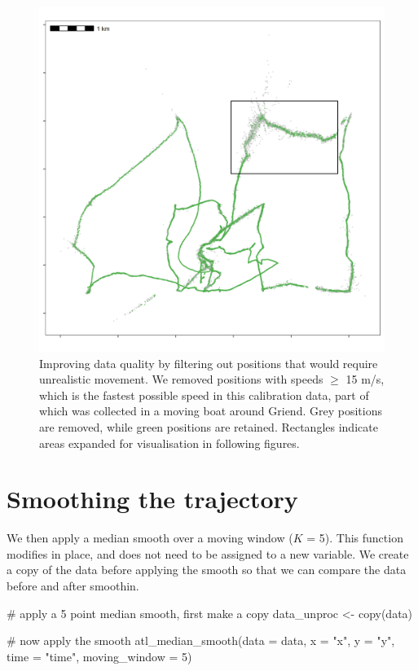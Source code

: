 \documentclass[]{scrreprt}
\newenvironment{Shaded}{}{}
\newcommand{\CommentTok}[1]{\textcolor[rgb]{0.00,0.50,0.00}{#1}}
\newcommand{\DataTypeTok}[1]{#1}
\newcommand{\DecValTok}[1]{#1}
\newcommand{\KeywordTok}[1]{\textcolor[rgb]{0.00,0.00,1.00}{#1}}
\newcommand{\NormalTok}[1]{#1}
\newcommand{\StringTok}[1]{\textcolor[rgb]{0.00,0.50,0.50}{#1}}
\begin{document}
\begin{figure}
\centering
\includegraphics{figures/fig_speed_outlier.png}
\caption{Improving data quality by filtering out positions that would require unrealistic movement. We removed positions with speeds \(\geq\) 15 m/s, which is the fastest possible speed in this calibration data, part of which was collected in a moving boat around Griend. Grey positions are removed, while green positions are retained. Rectangles indicate areas expanded for visualisation in following figures.}
\end{figure}

\hypertarget{smoothing-the-trajectory}{%
\section{Smoothing the trajectory}\label{smoothing-the-trajectory}}

We then apply a median smooth over a moving window (\(K\) = 5).
This function modifies in place, and does not need to be assigned to a new variable.
We create a copy of the data before applying the smooth so that we can compare the data before and after smoothin.

\begin{Shaded}
\begin{Highlighting}[]
\CommentTok{# apply a 5 point median smooth, first make a copy}
\NormalTok{data_unproc <-}\StringTok{ }\KeywordTok{copy}\NormalTok{(data)}

\CommentTok{# now apply the smooth}
\KeywordTok{atl_median_smooth}\NormalTok{(}\DataTypeTok{data =}\NormalTok{ data,}
                  \DataTypeTok{x =} \StringTok{"x"}\NormalTok{, }\DataTypeTok{y =} \StringTok{"y"}\NormalTok{, }\DataTypeTok{time =} \StringTok{"time"}\NormalTok{,}
                  \DataTypeTok{moving_window =} \DecValTok{5}\NormalTok{)}
\end{Highlighting}
\end{Shaded}
\end{document}
